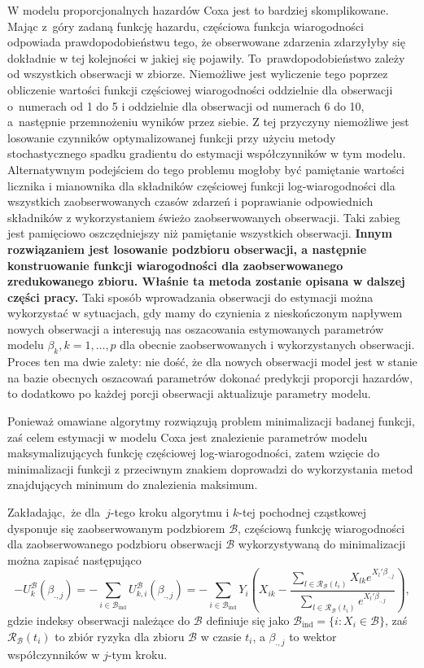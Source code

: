 W modelu proporcjonalnych hazardów Coxa jest to bardziej skomplikowane. Mając z~góry zadaną funkcję hazardu, częściowa funkcja wiarogodności odpowiada prawdopodobieństwu tego, że obserwowane zdarzenia zdarzyłyby się dokładnie w tej kolejności w jakiej się pojawiły. To~prawdopodobieństwo zależy od wszystkich obserwacji w zbiorze. Niemożliwe jest wyliczenie tego poprzez obliczenie wartości funkcji częściowej wiarogodności oddzielnie dla obserwacji o~numerach od 1 do 5 i oddzielnie dla obserwacji od numerach 6 do 10, a~następnie przemnożeniu wyników przez siebie. Z tej przyczyny niemożliwe jest losowanie czynników optymalizowanej funkcji przy użyciu metody stochastycznego spadku gradientu do estymacji współczynników w tym modelu. Alternatywnym podejściem do tego problemu mogłoby być pamiętanie wartości licznika i mianownika dla składników częściowej funkcji log-wiarogodności dla wszystkich zaobserwowanych czasów zdarzeń i poprawianie odpowiednich składników z wykorzystaniem świeżo zaobserwowanych obserwacji. Taki zabieg jest pamięciowo oszczędniejszy niż pamiętanie wszystkich obserwacji. \textbf{Innym rozwiązaniem jest losowanie podzbioru obserwacji, a następnie konstruowanie funkcji wiarogodności dla zaobserwowanego zredukowanego zbioru. Właśnie ta metoda zostanie opisana w dalszej części pracy.} Taki sposób wprowadzania obserwacji do estymacji można wykorzystać w sytuacjach, gdy mamy do czynienia z nieskończonym napływem nowych obserwacji a interesują nas oszacowania estymowanych parametrów modelu $\beta_k, k=1,\dots,p$ dla obecnie zaobserwowanych i wykorzystanych obserwacji. Proces ten ma dwie zalety: nie dość, że dla nowych obserwacji model jest w stanie na bazie obecnych oszacowań parametrów dokonać predykcji proporcji hazardów, to dodatkowo po każdej porcji obserwacji aktualizuje parametry modelu.

Ponieważ
omawiane algorytmy rozwiązują problem minimalizacji badanej funkcji, zaś
celem estymacji w modelu Coxa jest znalezienie parametrów modelu
maksymalizujących funkcję częściowej log-wiarogodności, zatem wzięcie do
minimalizacji funkcji z przeciwnym znakiem doprowadzi do wykorzystania
metod znajdujących minimum do znalezienia maksimum. 

Zakładając,~że dla~\(j\)-tego kroku
algorytmu i \(k\)-tej pochodnej cząstkowej dysponuje się zaobserwowanym podzbiorem
\(\mathcal{B}\), częściową funkcję wiarogodności dla zaobserwowanego podzbioru obserwacji \(\mathcal{B}\) wykorzystywaną do minimalizacji można zapisać następująco
\begin{equation}
-U^\mathcal{B}_k(\beta_{.,j})=-\sum\limits_{i \in \mathcal{B}_\text{ind}}^{}U^\mathcal{B}_{k,i}(\beta_{.,j})=-\sum\limits_{i \in \mathcal{B}_\text{ind}}^{}Y_i\left(X_{ik}-\dfrac{\sum\limits_{l\in \mathscr{R}_\mathcal{B}(t_i)}^{} X_{lk} e^{X_l'\beta_{.,j}}}{\sum\limits_{l\in \mathscr{R}_\mathcal{B}(t_i)}^{} e^{X_l'\beta_{.,j}}}\right),
\end{equation}
gdzie indeksy obserwacji należące do \(\mathcal{B}\) definiuje się jako
\(\mathcal{B}_{\text{ind}} = \{i: X_i \in \mathcal{B} \}\), zaś
\(\mathscr{R}_\mathcal{B}(t_i)\) to zbiór ryzyka dla zbioru
\(\mathcal{B}\) w czasie \(t_i\), a $\beta_{.,j}$ to wektor współczynników w $j$-tym kroku.

